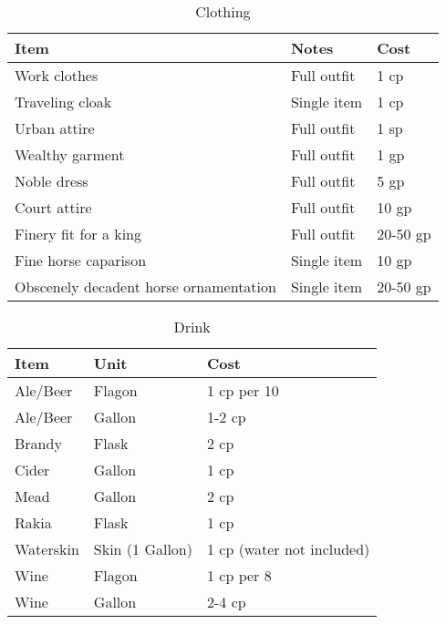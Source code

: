 \documentclass[oneside,11pt,english]{book}
\begin{document}
\begin{table}[hb]
  \centering
  \caption{Clothing}
  \label{tab:Clothing}
  \begin{tabu} spread 0pt {*{3}{X[-1]}}
    Item &Notes &Cost\\\toprule
    Work clothes &Full outfit &1 cp\\
    Traveling cloak &Single item &1 cp\\
    Urban attire &Full outfit &1 sp\\
    Wealthy garment &Full outfit &1 gp\\
    Noble dress &Full outfit &5 gp\\
    Court attire &Full outfit &10 gp\\
    Finery fit for a king &Full outfit &20-50 gp\\
    Fine horse caparison &Single item &10 gp\\
    Obscenely decadent horse ornamentation &Single item &20-50 gp\\
  \end{tabu}
\end{table}

\begin{table}[hb]
  \centering
  \caption{Drink}
  \label{tab:Drink}
  \begin{tabu} spread 0pt {*{3}{X[-1]}}
    Item &Unit &Cost\\\toprule
    Ale/Beer &Flagon &1 cp per 10\\
    Ale/Beer &Gallon &1-2 cp\\
    Brandy &Flask &2 cp\\
    Cider &Gallon &1 cp\\
    Mead &Gallon &2 cp\\
    Rakia &Flask &1 cp\\
    Waterskin &Skin (1 Gallon) &1 cp (water not included)\\
    Wine &Flagon &1 cp per 8\\
    Wine &Gallon &2-4 cp\\
  \end{tabu}
\end{table}
\end{document}
